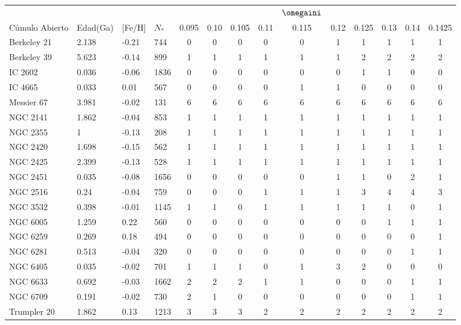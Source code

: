 \newpage
{}
\recalctypearea

\begin{longtable}[c]{|l l l l || c c c c c c c c c c|}
	\hline
	& & & & & & & & $\omegaini$ & & & & & \\
	Cúmulo Abierto & Edad(Ga) & [Fe/H] & $N_*$ & 0.095 & 0.10 & 0.105 & 0.11 & 0.115 & 0.12 & 0.125 & 0.13 & 0.14 & 0.1425\\
	\hline
	Berkeley 21 & 2.138 & -0.21 & 744 & 0 & 0 & 0 & 0 & 0 & 1 & 1 & 1 & 1 & 1\\
	Berkeley 39 & 5.623 & -0.14 & 899 & 1 & 1 & 1 & 1 & 1 & 1 & 2 & 2 & 2 & 2\\
	IC 2602 & 0.036 & -0.06 & 1836 & 0 & 0 & 0 & 0 & 0 & 0 & 1 & 1 & 0 & 0\\
	IC 4665 & 0.033 & 0.01 & 567 & 0 & 0 & 0 & 0 & 1 & 1 & 0 & 0 & 0 & 0\\
	Messier 67 & 3.981 & -0.02 & 131 & 6 & 6 & 6 & 6 & 6 & 6 & 6 & 6 & 6 & 6\\
	NGC 2141 & 1.862 & -0.04 & 853 & 1 & 1 & 1 & 1 & 1 & 1 & 1 & 1 & 1 & 1\\
	NGC 2355 & 1 & -0.13 & 208 & 1 & 1 & 1 & 1 & 1 & 1 & 1 & 1 & 1 & 1\\
	NGC 2420 & 1.698 & -0.15 & 562 & 1 & 1 & 1 & 1 & 1 & 1 & 1 & 1 & 1 & 1\\
	NGC 2425 & 2.399 & -0.13 & 528 & 1 & 1 & 1 & 1 & 1 & 1 & 1 & 1 & 1 & 1\\
	NGC 2451 & 0.035 & -0.08 & 1656 & 0 & 0 & 0 & 0 & 0 & 1 & 1 & 0 & 2 & 1\\
	NGC 2516 & 0.24 & -0.04 & 759 & 0 & 0 & 0 & 1 & 1 & 1 & 3 & 4 & 4 & 3\\
	NGC 3532 & 0.398 & -0.01 & 1145 & 1 & 1 & 0 & 1 & 1 & 1 & 1 & 1 & 0 & 1\\
	NGC 6005 & 1.259 & 0.22 & 560 & 0 & 0 & 0 & 0 & 0 & 0 & 0 & 1 & 1 & 1\\
	NGC 6259 & 0.269 & 0.18 & 494 & 0 & 0 & 0 & 0 & 0 & 0 & 0 & 0 & 0 & 1\\
	NGC 6281 & 0.513 & -0.04 & 320 & 0 & 0 & 0 & 0 & 0 & 0 & 0 & 0 & 1 & 1\\
	NGC 6405 & 0.035 & -0.02 & 701 & 1 & 1 & 1 & 0 & 1 & 3 & 2 & 0 & 0 & 0\\
	NGC 6633 & 0.692 & -0.03 & 1662 & 2 & 2 & 2 & 1 & 1 & 0 & 0 & 0 & 1 & 1\\
	NGC 6709 & 0.191 & -0.02 & 730 & 2 & 1 & 0 & 0 & 0 & 0 & 0 & 0 & 1 & 1\\
	Trumpler 20 & 1.862 & 0.13 & 1213 & 3 & 3 & 3 & 2 & 2 & 2 & 2 & 2 & 2 & 2\\

\end{longtable}
